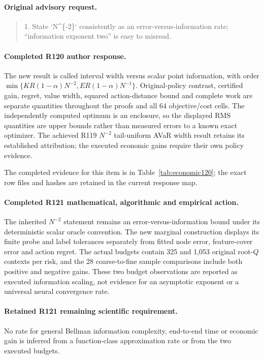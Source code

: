 \paragraph{Original advisory request.}
\begin{quote}
1. State `N\textasciicircum{}\{-2\}` consistently as an error-versus-information rate; “information exponent two” is easy to misread.
\end{quote}

\paragraph{Completed R120 author response.}
The new result is called interval width versus scalar point information, with order $\min\{KR(1-\alpha)N^{-2},ER(1-\alpha)N^{-1}\}$. Original-policy contrast, certified gain, regret, value width, squared action-distance bound and complete work are separate quantities throughout the proofs and all 64 objective/cost cells. The independently computed optimum is an enclosure, so the displayed RMS quantities are upper bounds rather than measured errors to a known exact optimizer. The achieved R119 $N^{-2}$ tail-uniform AVaR width result retains its established attribution; the executed economic gains require their own policy evidence.

The completed evidence for this item is in Table~\ref{tab:economic120}; the exact row files and hashes are retained in the current response map.

\paragraph{Completed R121 mathematical, algorithmic and empirical action.}
The inherited $N^{-2}$ statement remains an error-versus-information bound under its deterministic scalar oracle convention. The new marginal construction displays its finite probe and label tolerances separately from fitted node error, feature-cover error and action regret. The actual budgets contain 325 and 1,053 original root-$Q$ contexts per risk, and the 28 coarse-to-fine sample comparisons include both positive and negative gains. These two budget observations are reported as executed information scaling, not evidence for an asymptotic exponent or a universal neural convergence rate.

\paragraph{Retained R121 remaining scientific requirement.}
No rate for general Bellman information complexity, end-to-end time or economic gain is inferred from a function-class approximation rate or from the two executed budgets.

